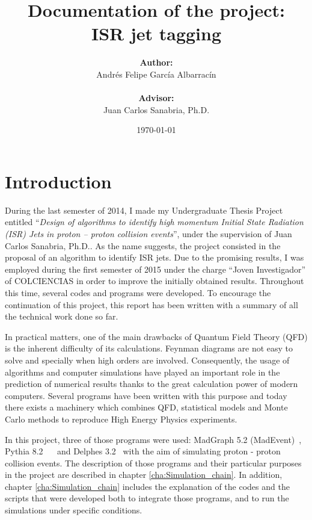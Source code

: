 \documentclass[12pt, oneside]{book}              %
\title{\bf Documentation of the project: \\ ISR jet tagging}
\author{\textbf{Author:}\\ Andr\'es Felipe Garc\'ia Albarrac\'in \\ \\ \textbf{Advisor:} \\ Juan Carlos Sanabria, Ph.D.}
\date{\today}
\begin{document}
	\frontmatter                            %
	\maketitle                              %
	\tableofcontents                        %
	\mainmatter                             %

\chapter{Introduction}

During the last semester of 2014, I made my Undergraduate Thesis Project entitled 
``\textit{Design of algorithms to identify high momentum Initial State Radiation 
(ISR) Jets in proton – proton collision events}'', under the supervision of Juan
Carlos Sanabria, Ph.D.. As the name suggests, the project consisted in the proposal
of an algorithm to identify ISR jets. Due to the promising results, I was employed 
during the first semester of 2015 under the charge ``Joven Investigador'' of 
COLCIENCIAS in order to improve the initially obtained results. Throughout this
time, several codes and programs were developed. To encourage the continuation of
this project, this report has been written with a summary of all the technical 
work done so far.

In practical matters, one of the main drawbacks of Quantum Field Theory (QFD) is 
the inherent difficulty of its calculations. Feynman diagrams are not easy to solve
and specially when high orders are involved. Consequently, the usage of algorithms
and computer simulations have played an important role in the prediction of 
numerical results thanks to the great calculation power of modern computers. Several
programs have been written with this purpose and today there exists a machinery
which combines QFD, statistical models and Monte Carlo methods to reproduce High
Energy Physics experiments.

In this project, three of those programs were used: 
MadGraph 5.2 (MadEvent)~\cite{Alwall:2014hca}, Pythia 8.2~\cite{Sjostrand:2014zea} 
~\cite{Sjostrand:2006za} and Delphes 3.2~\cite{deFavereau:2013fsa} with the aim of 
simulating proton - proton collision events. The description of those programs and
their particular purposes in the project are described in chapter 
\ref{cha:Simulation_chain}. In addition, chapter \ref{cha:Simulation_chain}
includes the explanation of the codes and the scripts that were developed
both to integrate those programs, and to run the simulations under specific conditions.
\end{document}
